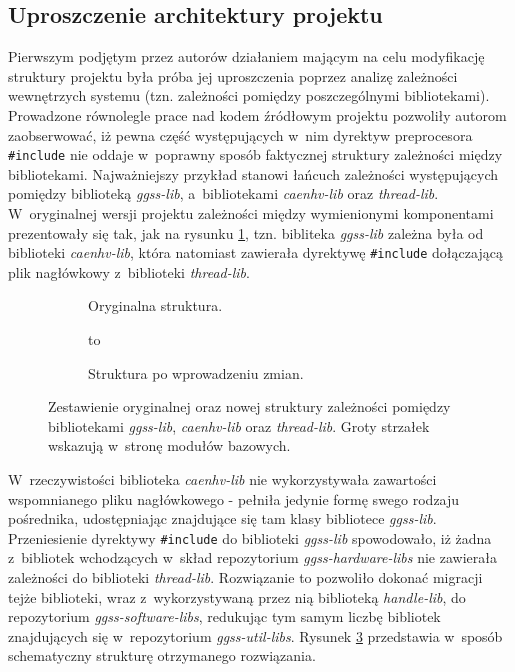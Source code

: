 \subsection{Uproszczenie architektury projektu}
Pierwszym podjętym przez autorów działaniem mającym na celu modyfikację struktury projektu była próba jej uproszczenia poprzez analizę zależności wewnętrzych systemu (tzn. zależności pomiędzy poszczególnymi bibliotekami). Prowadzone równolegle prace nad kodem źródłowym projektu pozwoliły autorom zaobserwować, iż pewna część występujących w~nim dyrektyw preprocesora \lstinline{#include} nie oddaje w~poprawny sposób faktycznej struktury zależności między bibliotekami. Najważniejszy przykład stanowi łańcuch zależności występujących pomiędzy biblioteką \emph{ggss-lib}, a~bibliotekami \emph{caenhv-lib} oraz \emph{thread-lib}. W~oryginalnej wersji projektu zależności między wymienionymi komponentami prezentowały się tak, jak na rysunku \ref{fig:dependency_problem_old}, tzn. bibliteka \emph{ggss-lib} zależna była od biblioteki \emph{caenhv-lib}, która natomiast zawierała dyrektywę \lstinline{#include} dołączającą plik nagłówkowy z~biblioteki \emph{thread-lib}.



\begin{figure}[H]
\centering
\begin{subfigure}[t]{0.40\textwidth}
\centering
\usebox{\mybox}
\caption{Oryginalna struktura.}
\label{fig:dependency_problem_old}
\end{subfigure}
\hfill
\begin{subfigure}[t]{0.55\textwidth}
\centering
\vbox to \ht{}
\caption{Struktura po wprowadzeniu zmian.}
\label{fig:dependency_problem_solved}
\end{subfigure}

\caption{Zestawienie oryginalnej oraz nowej struktury zależności pomiędzy bibliotekami \emph{ggss-lib}, \emph{caenhv-lib} oraz \emph{thread-lib}. Groty strzałek wskazują w~stronę modułów bazowych.}
\end{figure}

W~rzeczywistości biblioteka \emph{caenhv-lib} nie wykorzystywała zawartości wspomnianego pliku nagłówkowego - pełniła jedynie formę swego rodzaju pośrednika, udostępniając znajdujące się tam klasy bibliotece \emph{ggss-lib}. Przeniesienie dyrektywy \lstinline{#include} do biblioteki \emph{ggss-lib} spowodowało, iż żadna z~bibliotek wchodzących w~skład repozytorium \emph{ggss-hardware-libs} nie zawierała zależności do biblioteki \emph{thread-lib}. Rozwiązanie to pozwoliło dokonać migracji tejże biblioteki, wraz z~wykorzystywaną przez nią biblioteką \emph{handle-lib}, do repozytorium \emph{ggss-software-libs}, redukując tym samym liczbę bibliotek znajdujących się w~repozytorium \emph{ggss-util-libs}. Rysunek \ref{fig:dependency_problem_solved} przedstawia w~sposób schematyczny strukturę otrzymanego rozwiązania.

